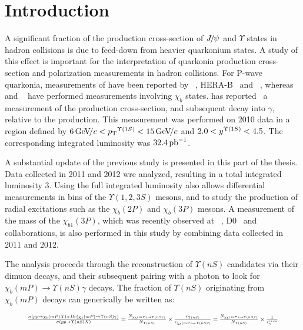 \section{Introduction}
\label{sec:introduction}

A significant fraction of the production cross-section of ${J\mskip -3mu/\mskip -2mu\psi\mskip 2mu}$ and
$\Upsilon$ states in hadron collisions is due to feed-down from heavier
quarkonium states. A study of this effect is important for the interpretation of
quarkonia production cross-section and polarization measurements in hadron
collisions. For P-wave quarkonia, measurements of \chic have been reported by
\cdf~\cite{Abulencia:2007bra}, HERA-B~\cite{Abt:2008ed}
and \lhcb~\cite{LHCb-PAPER-2011-019}, whereas \cdf~\cite{Affolder:1999wm} and 
\atlas~\cite{Aad:2011ih} have performed measurements involving $\chi_b$ states.
\lhcb has reported~\cite{LHCb-PAPER-2012-015} a measurement of
the \chibOneP production cross-section, and subsequent decay into \OneS $\gamma$,
relative to the \OneS production. This measurement was performed on 2010 data
in a region defined by $6 \gevc < \pt^{\Y1S} < 15 \gevc$ and
$2.0 < y^{\Y1S} < 4.5$. The corresponding integrated luminosity was $32.4\mbox{\,pb}^{-1}$.

A substantial update of the previous \lhcb study is presented in this part of
the thesis. Data collected in 2011 and 2012 wre analyzed, resulting in a total
integrated luminosity 3\invfb. Using the full integrated luminosity also allows
differential measurements in \pt bins of the $\Upsilon(1,2,3S)$ mesons, and to
study the production of radial excitations such as the $\chi_b(2P)$ and
$\chi_b(3P)$ mesons. A measurement of the mass of the $\chi_{b1}(3P)$, which was recently
observed at \atlas~\cite{Aad:2011ih}, D0~\cite{Abazov:2012gh} and
\lhcb~\cite{LHCb-CONF-2012-020} collaborations, is also performed in this study by
combining data collected in 2011 and 2012.

The analysis proceeds through the reconstruction of $\Upsilon(nS)$ candidates
via their dimuon decays, and their subsequent pairing with a photon to look for
$\chi_b(mP) \to \Upsilon(nS) \gamma$ decays.  The fraction of $\Upsilon(nS)$
originating from $\chi_b(mP)$ decays can generically be written as:

\begin{equation}
\resizebox{.9\hsize}{!}{
$
\frac{\sigma(pp \to \chi_b (mP) X) \times Br (\chi_b (mP) \to \Upsilon(nS) \gamma)}{\sigma(pp \to \Upsilon(nS) X)} =
\frac{N_{\chi_b (mP)\to \Upsilon(nS) \gamma}}{N_{\Upsilon(nS)}} \times \frac{\epsilon_{\Upsilon(nS)}}{\epsilon_{\chi_b (mP)\to \Upsilon(nS) \gamma}} =
\frac{N_{\chi_b (mP)\to \Upsilon(nS) \gamma}}{N_{\Upsilon(nS)}} \times \frac{1}{\epsilon^{reco}_{\gamma}}
$
}
\label{eqn:master}
\end{equation}


